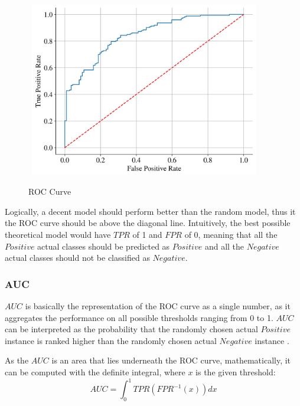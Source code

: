  \begin{figure}[H]
    \centering
    \caption{ROC Curve}\vspace{0.5em}
    \label{fig:roccurvetheory}\
    \includegraphics[width=100mm]{Figures/ROC_theory.jpg}

    \vspace{-1em}
\end{figure}

Logically, a decent model should perform better than the random model, thus it the ROC curve should be above the diagonal line.
Intuitively, the best possible theoretical model would have $TPR$ of 1 and $FPR$ of 0, meaning that all the $Positive$ actual classes should be predicted as $Positive$ and all the $Negative$ actual classes should not be classified as $Negative$.
 \newpage
\subsubsection{AUC}

$AUC$ is basically the representation of the ROC curve as a single number, as it aggregates the performance on all possible thresholds ranging from 0 to 1.
$AUC$ can be interpreted as the probability that the randomly chosen actual $Positive$ instance is ranked higher than the randomly chosen actual $Negative$ instance \citep{janitza2013auc}.


As the $AUC$ is an area that lies underneath the ROC curve, mathematically, it can be computed with the definite integral, where $x$ is the given threshold:
\begin{equation}\label{eq}
AUC = \int_{0}^{1} TPR \left(FPR^{-1}\left(x \right)\right) dx
\end{equation}



